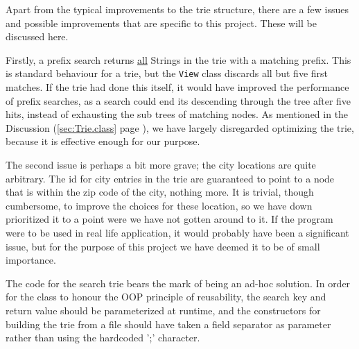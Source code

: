 Apart from the typical improvements to the trie structure, there are a few issues and possible improvements that are specific to this project. These will be discussed here.

Firstly, a prefix search returns \underline{all} Strings in the trie with a matching prefix.
This is standard behaviour for a trie, but the \texttt{View} class discards all but five first matches. If the trie had done this itself, it would have improved the performance of prefix searches, as a search could end its descending through the tree after five hits, instead of exhausting the sub trees of matching nodes. As mentioned in the Discussion (\ref{sec:Trie.class} page \pageref{sec:Trie.class}),
we have largely disregarded optimizing the trie, because it is effective enough for our purpose.

The second issue is perhaps a bit more grave; the city locations are quite arbitrary.
The id for city entries in the trie are guaranteed to point to a node that is within the zip code of the city, nothing more. It is trivial, though cumbersome, to improve the choices for these location, so we have down prioritized it to a point were we have not gotten around to it.
If the program were to be used in real life application, it would probably have been a significant issue, but for the purpose of this project we have deemed it to be of small importance.

The code for the search trie bears the mark of being an ad-hoc solution. In order for the class to honour the OOP principle of reusability, the search key and return value should be parameterized at runtime, and the constructors for building the trie from a file should have taken a field separator as parameter rather than using the hardcoded ';' character.
